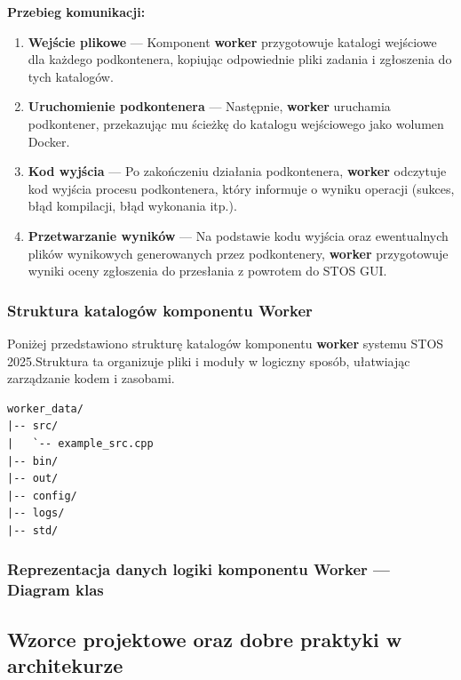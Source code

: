\documentclass[12pt,a4paper]{article}
\begin{document}
\textbf{Przebieg komunikacji:}
\begin{enumerate}
    \item \textbf{Wejście plikowe} --- Komponent \textbf{worker} przygotowuje katalogi wejściowe dla każdego podkontenera, kopiując odpowiednie pliki zadania i zgłoszenia do tych katalogów.
    \item \textbf{Uruchomienie podkontenera} --- Następnie, \textbf{worker} uruchamia podkontener, przekazując mu ścieżkę do katalogu wejściowego jako wolumen Docker.
    \item \textbf{Kod wyjścia} --- Po zakończeniu działania podkontenera, \textbf{worker} odczytuje kod wyjścia procesu podkontenera, który informuje o wyniku operacji (sukces, błąd kompilacji, błąd wykonania itp.).
    \item \textbf{Przetwarzanie wyników} --- Na podstawie kodu wyjścia oraz ewentualnych plików wynikowych generowanych przez podkontenery, \textbf{worker} przygotowuje wyniki oceny zgłoszenia do przesłania z powrotem do STOS GUI.
\end{enumerate}


\subsubsection{Struktura katalogów komponentu Worker}
Poniżej przedstawiono strukturę katalogów komponentu \textbf{worker} systemu STOS 2025.\@ Struktura ta organizuje pliki i moduły w logiczny sposób, ułatwiając zarządzanie kodem i zasobami.
\begin{verbatim}
worker_data/
|-- src/
|   `-- example_src.cpp
|-- bin/
|-- out/
|-- config/
|-- logs/
|-- std/
\end{verbatim}


\subsubsection{Reprezentacja danych logiki komponentu Worker --- Diagram klas}

\subsection{Wzorce projektowe oraz dobre praktyki w architekurze}
\end{document}
